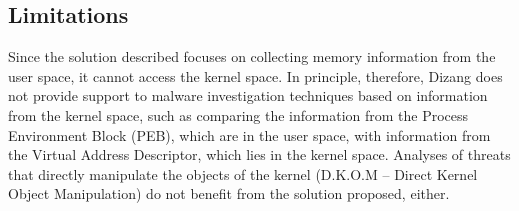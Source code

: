 \documentclass[conference]{IEEEtran}
\newcommand{\fancyname}{Dizang }
\begin{document}
\subsection{Limitations}

Since the solution described focuses on collecting memory information from the user space, it cannot access the kernel space. 
%
In principle, therefore, \fancyname does not provide support to malware investigation techniques based on information from the kernel space, such as comparing the information from the Process Environment Block (PEB), which are in the user space, with information from the Virtual Address Descriptor, which lies in the kernel space. 
%
Analyses of threats that directly manipulate the objects of the kernel (D.K.O.M – Direct Kernel Object Manipulation) do not benefit from the solution proposed, either. 


%
%



%
%
\end{document}
